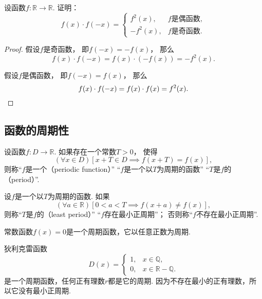 \begin{example}
设函数\(f\colon\mathbb{R}\to\mathbb{R}\).
证明：\[
	f(x) \cdot f(-x) = \left\{ \begin{array}{rl}
		f^2(x), & \text{$f$是偶函数}, \\
		-f^2(x), & \text{$f$是奇函数}.
	\end{array} \right.
\]
\begin{proof}
假设\(f\)是奇函数，
即\(f(-x)=-f(x)\)，
那么\[
	f(x) \cdot f(-x)
	=f(x) \cdot (-f(x))
	=-f^2(x).
\]

假设\(f\)是偶函数，
即\(f(-x)=f(x)\)，
那么\[
	f(x) \cdot f(-x)
	=f(x) \cdot f(x)
	=f^2(x).
	\qedhere
\]
\end{proof}
\end{example}

\subsection{函数的周期性}
\begin{definition}
设函数\(f\colon D\to\mathbb{R}\).
如果存在一个常数\(T>0\)，
使得\[
	(\forall x \in D)
	[x+T \in D \implies f(x+T) = f(x)],
\]
则称“\(f\)是一个（periodic function）”
“\(f\)是一个以\(T\)为周期的函数”
“\(T\)是\(f\)的（period）”.
\end{definition}

\begin{definition}
设\(f\)是一个以\(T\)为周期的函数.
如果\[
	(\forall a\in\mathbb{R})
	[0<a<T \implies f(x+a) \neq f(x)],
\]
则称“\(T\)是\(f\)的（least period）”
“\(f\)存在最小正周期”；
否则称“\(f\)不存在最小正周期”.
\end{definition}

\begin{example}\label{example:函数的性质.周期性.常数函数}
常数函数\(f(x) = 0\)是一个周期函数，它以任意正数为周期.
\end{example}

\begin{example}\label{example:函数的性质.周期性.狄利克雷函数}
狄利克雷函数\[
	D(x) = \left\{ \begin{array}{ll}
		1, & x \in \mathbb{Q}, \\
		0, & x \in \mathbb{R}-\mathbb{Q}.
	\end{array} \right.
\]是一个周期函数，任何正有理数\(r\)都是它的周期.
因为不存在最小的正有理数，所以它没有最小正周期.
\end{example}

